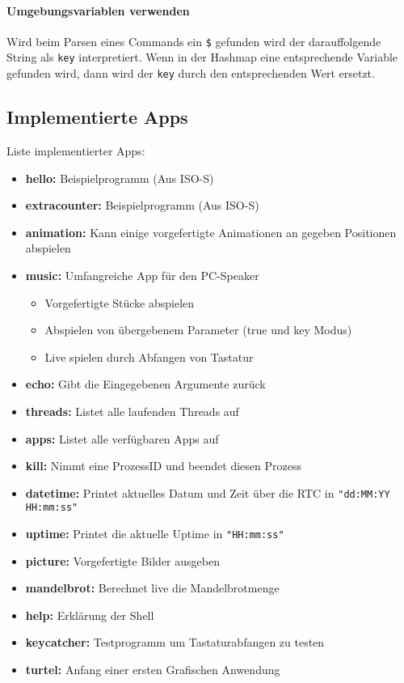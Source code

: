         \paragraph{Umgebungsvariablen verwenden}
            Wird beim Parsen eines Commands ein \verb|$| gefunden wird der darauffolgende String als \verb|key| interpretiert. Wenn in der Hashmap eine entsprechende Variable gefunden wird, dann wird der \verb|key| durch den entsprechenden Wert ersetzt.

\subsection{Implementierte Apps}
    Liste implementierter Apps:
    \begin{itemize}
        \item \textbf{hello:} Beispielprogramm (Aus ISO-S)
        \item \textbf{extracounter:} Beispielprogramm (Aus ISO-S)
        \item \textbf{animation:} Kann einige vorgefertigte Animationen an gegeben Positionen abspielen
        \item \textbf{music:} Umfangreiche App für den PC-Speaker\begin{itemize}
            \item Vorgefertigte Stücke abspielen
            \item Abspielen von übergebenem Parameter (true und key Modus)
            \item Live spielen durch Abfangen von Tastatur
        \end{itemize}
        \item \textbf{echo:} Gibt die Eingegebenen Argumente zurück
        \item \textbf{threads:} Listet alle laufenden Threads auf
        \item \textbf{apps:} Listet alle verfügbaren Apps auf
        \item \textbf{kill:} Nimmt eine ProzessID und beendet diesen Prozess
        \item \textbf{datetime:} Printet aktuelles Datum und Zeit über die RTC in \verb|"dd:MM:YY   HH:mm:ss"|
        \item \textbf{uptime:} Printet die aktuelle Uptime in \verb|"HH:mm:ss"|
        \item \textbf{picture:} Vorgefertigte Bilder ausgeben
        \item \textbf{mandelbrot:} Berechnet live die Mandelbrotmenge
        \item \textbf{help:} Erklärung der Shell
        \item \textbf{keycatcher:} Testprogramm um Tastaturabfangen zu testen
        \item \textbf{turtel:} Anfang einer ersten Grafischen Anwendung
    \end{itemize}

